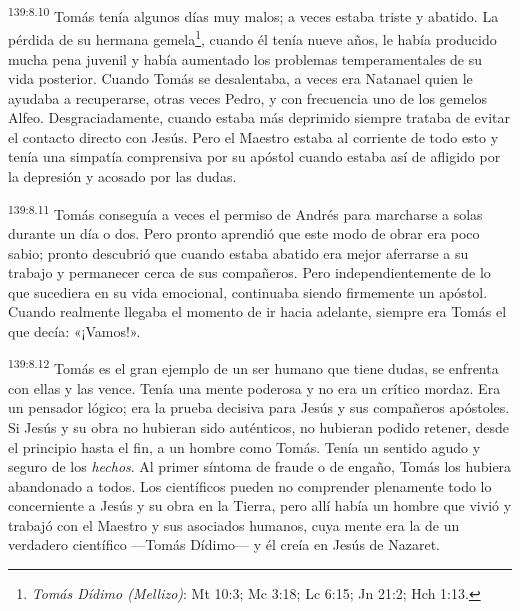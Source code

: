 \par
\textsuperscript{139:8.10} Tomás tenía algunos días muy malos; a veces estaba triste y abatido. La pérdida de su hermana gemela\footnote{\textit{Tomás Dídimo (Mellizo)}: Mt 10:3; Mc 3:18; Lc 6:15; Jn 21:2; Hch 1:13.}, cuando él tenía nueve años, le había producido mucha pena juvenil y había aumentado los problemas temperamentales de su vida posterior. Cuando Tomás se desalentaba, a veces era Natanael quien le ayudaba a recuperarse, otras veces Pedro, y con frecuencia uno de los gemelos Alfeo. Desgraciadamente, cuando estaba más deprimido siempre trataba de evitar el contacto directo con Jesús. Pero el Maestro estaba al corriente de todo esto y tenía una simpatía comprensiva por su apóstol cuando estaba así de afligido por la depresión y acosado por las dudas.

\par
\textsuperscript{139:8.11} Tomás conseguía a veces el permiso de Andrés para marcharse a solas durante un día o dos. Pero pronto aprendió que este modo de obrar era poco sabio; pronto descubrió que cuando estaba abatido era mejor aferrarse a su trabajo y permanecer cerca de sus compañeros. Pero independientemente de lo que sucediera en su vida emocional, continuaba siendo firmemente un apóstol. Cuando realmente llegaba el momento de ir hacia adelante, siempre era Tomás el que decía: «¡Vamos!».

\par
\textsuperscript{139:8.12} Tomás es el gran ejemplo de un ser humano que tiene dudas, se enfrenta con ellas y las vence. Tenía una mente poderosa y no era un crítico mordaz. Era un pensador lógico; era la prueba decisiva para Jesús y sus compañeros apóstoles. Si Jesús y su obra no hubieran sido auténticos, no hubieran podido retener, desde el principio hasta el fin, a un hombre como Tomás. Tenía un sentido agudo y seguro de los \textit{hechos}. Al primer síntoma de fraude o de engaño, Tomás los hubiera abandonado a todos. Los científicos pueden no comprender plenamente todo lo concerniente a Jesús y su obra en la Tierra, pero allí había un hombre que vivió y trabajó con el Maestro y sus asociados humanos, cuya mente era la de un verdadero científico ---Tomás Dídimo--- y él creía en Jesús de Nazaret.

